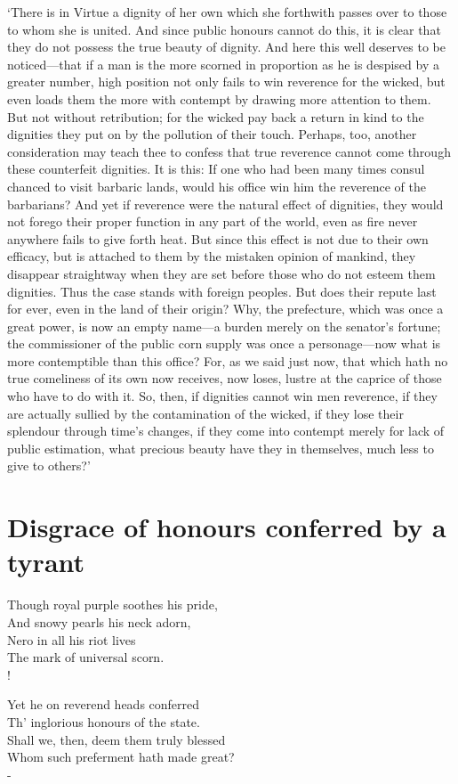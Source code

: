 \documentclass[11pt]{book}
\newenvironment{vpoem}[1]%
  {%
    \centerpoemon{Down their cheeks unfeigned the tear drops}
    \def\poemvsindentlines{#1}\begin{poem}\footnotesize%
  }%
  {%
    \end{poem}\def\poemvsindentlines{\relax}%
    \centerpoemoff
  }
\begin{document}
`There is in Virtue a dignity of her own which she forthwith passes over
to those to whom she is united. And since public honours cannot do this,
it is clear that they do not possess the true beauty of dignity. And
here this well deserves to be noticed---that if a man is the more scorned
in proportion as he is despised by a greater number, high position not
only fails to win reverence for the wicked, but even loads them the more
with contempt by drawing more attention to them. But not without
retribution; for the wicked pay back a return in kind to the dignities
they put on by the pollution of their touch. Perhaps, too, another
consideration may teach thee to confess that true reverence cannot come
through these counterfeit dignities. It is this: If one who had been
many times consul chanced to visit barbaric lands, would his office win
him the reverence of the barbarians? And yet if reverence were the
natural effect of dignities, they would not forego their proper function
in any part of the world, even as fire never anywhere fails to give
forth heat. But since this effect is not due to their own efficacy, but
is attached to them by the mistaken opinion of mankind, they disappear
straightway when they are set before those who do not esteem them
dignities. Thus the case stands with foreign peoples. But does their
repute last for ever, even in the land of their origin? Why, the
prefecture, which was once a great power, is now an empty name---a burden
merely on the senator's fortune; the commissioner of the public corn
supply was once a personage---now what is more contemptible than this
office? For, as we said just now, that which hath no true comeliness of
its own now receives, now loses, lustre at the caprice of those who have
to do with it. So, then, if dignities cannot win men reverence, if they
are actually sullied by the contamination of the wicked, if they lose
their splendour through time's changes, if they come into contempt
merely for lack of public estimation, what precious beauty have they in
themselves, much less to give to others?'




\section{Disgrace of honours conferred by a tyrant}

\begin{vpoem}{24}
    Though royal purple soothes his pride, \\
      And snowy pearls his neck adorn, \\
    Nero in all his riot lives \\
      The mark of universal scorn. \\!

    Yet he on reverend heads conferred \\
      Th' inglorious honours of the state. \\
    Shall we, then, deem them truly blessed \\
      Whom such preferment hath made great? \\-
\end{vpoem}
\end{document}
